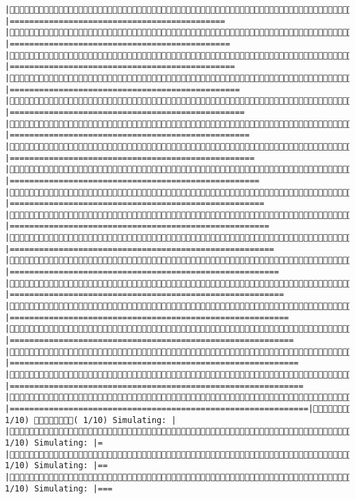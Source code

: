 \documentclass[]{article}
\begin{document}
\begin{verbatim}
|Simulating: |============================================                 |Simulating: |=============================================                |Simulating: |==============================================               |Simulating: |===============================================              |Simulating: |================================================             |Simulating: |=================================================            |Simulating: |==================================================           |Simulating: |===================================================          |Simulating: |====================================================         |Simulating: |=====================================================        |Simulating: |======================================================       |Simulating: |=======================================================      |Simulating: |========================================================     |Simulating: |=========================================================    |Simulating: |==========================================================   |Simulating: |===========================================================  |Simulating: |============================================================ |Simulating: |=============================================================|( 1/10) ( 1/10) Simulating: |                                                     |( 1/10) Simulating: |=                                                    |( 1/10) Simulating: |==                                                   |( 1/10) Simulating: |===                                                  
\end{verbatim}
\end{document}

